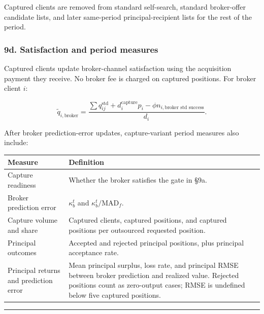 \documentclass[11pt]{article}
\begin{document}
Captured clients are removed from standard self-search, standard broker-offer candidate lists, and later same-period principal-recipient lists for the rest of the period.

\subsubsection{9d. Satisfaction and period measures}\label{d.-satisfaction-and-period-measures}

Captured clients update broker-channel satisfaction using the acquisition payment they receive. No broker fee is charged on captured positions. For broker client \(i\):

\[
\tilde{q}_{i,\text{broker}} =
\frac{\sum q_{ij}^{\text{std}} + d_i^{\text{capture}} p_i - \phi n_{i,\text{broker std success}}}{d_i}.
\]

After broker prediction-error updates, capture-variant period measures also include:

{
\begin{longtable}[]{@{}
  >{\raggedright\arraybackslash}p{}
  >{\raggedright\arraybackslash}p{}@{}}
\toprule\noalign{}
\begin{minipage}[b]{\linewidth}\raggedright
Measure
\end{minipage} & \begin{minipage}[b]{\linewidth}\raggedright
Definition
\end{minipage} \\
\midrule\noalign{}
\endhead
\bottomrule\noalign{}
\endlastfoot
Capture readiness & Whether the broker satisfies the gate in §9a. \\
Broker prediction error & \(\kappa_b^t\) and \(\kappa_b^t/\mathrm{MAD}_f\). \\
Capture volume and share & Captured clients, captured positions, and captured positions per outsourced requested position. \\
Principal outcomes & Accepted and rejected principal positions, plus principal acceptance rate. \\
Principal returns and prediction error & Mean principal surplus, loss rate, and principal RMSE between broker prediction and realized value. Rejected positions count as zero-output cases; RMSE is undefined below five captured positions. \\
\end{longtable}
}

\begin{center}\rule{0.5\linewidth}{0.5pt}\end{center}
\end{document}
